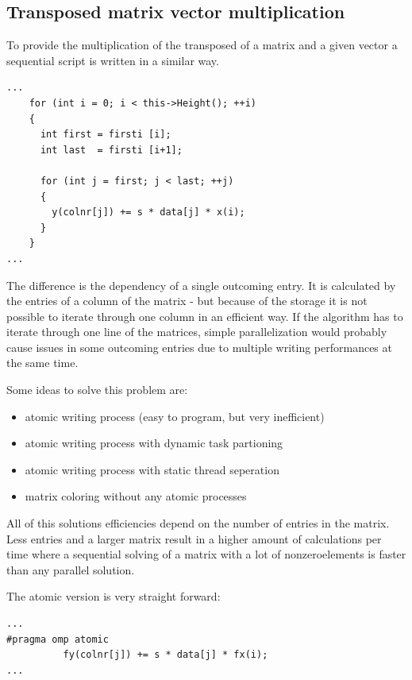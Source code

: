 \documentclass[a4paper,11pt]{scrartcl}
\begin{document}
\subsection{Transposed matrix vector multiplication}

To provide the multiplication of the transposed of a matrix and a given vector
 a sequential script is written in a similar way.

\begin{lstlisting}
...
    for (int i = 0; i < this->Height(); ++i)
    {
      int first = firsti [i];
      int last  = firsti [i+1];

      for (int j = first; j < last; ++j)
      {
        y(colnr[j]) += s * data[j] * x(i);
      }
    }
...
\end{lstlisting}

The difference is the dependency of a single outcoming entry. It is calculated
 by the entries of a column of the matrix - but because of the storage it is not
possible to iterate through one column in an efficient way. If the algorithm
has to iterate through one line of the matrices, simple parallelization would
probably cause issues in some outcoming entries due to multiple writing
performances at the same time.

Some ideas to solve this problem are:

\begin{itemize}

\item atomic writing process (easy to program, but very inefficient)
\item atomic writing process with dynamic task partioning
\item atomic writing process with static thread seperation
\item matrix coloring without any atomic processes

\end{itemize}

All of this solutions efficiencies depend on the number of entries in the matrix.
Less entries and a larger matrix result in a higher amount of calculations per
 time where a sequential solving of a matrix with a lot of nonzeroelements is
 faster than any parallel solution.

The atomic version is very straight forward:

\begin{lstlisting}
...
#pragma omp atomic
          fy(colnr[j]) += s * data[j] * fx(i);
...
\end{lstlisting}
\end{document}
